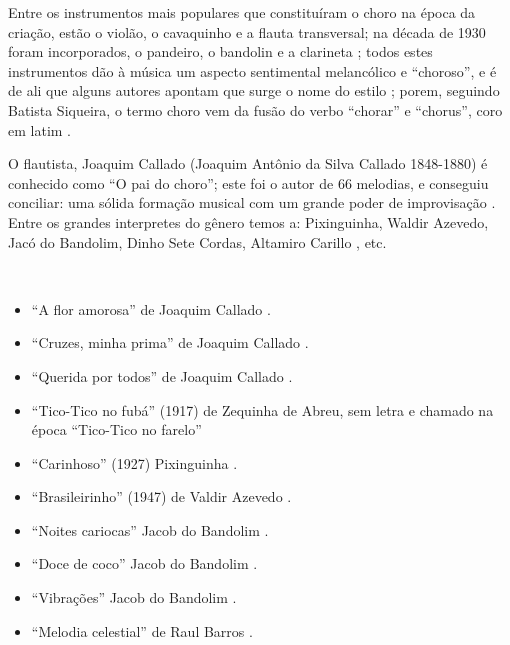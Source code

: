 \begin{description}
Entre os instrumentos mais populares que constituíram o choro na época da criação, 
estão o violão, o cavaquinho e a flauta transversal;
na década de 1930 foram incorporados, o pandeiro, o bandolin e a clarineta \cite[pp. 64]{reinato2010musica} \cite[pp. 79]{dourado2004dicionario} \cite[pp. 132]{perna2002samba};
todos estes instrumentos dão à música um aspecto sentimental melancólico e ``choroso'', e
é de ali que alguns autores apontam que surge o nome do estilo \cite[pp. 132]{perna2002samba};
porem, seguindo Batista Siqueira, 
o termo choro vem da fusão do verbo ``chorar'' e ``chorus'', coro em latim \cite[pp. 13]{diniz2003almanaque}.

O flautista, Joaquim Callado (Joaquim Antônio da Silva Callado 1848-1880) 
é conhecido como ``O pai do choro'';
este foi o autor de 66 melodias, e conseguiu conciliar: 
uma sólida formação musical com um grande poder de improvisação  \cite[pp. 15]{diniz2003almanaque} \cite[pp. 64]{reinato2010musica}.
Entre os grandes interpretes do gênero temos a:
Pixinguinha, Waldir Azevedo, Jacó do Bandolim, Dinho Sete Cordas, Altamiro Carillo \cite[pp. 79]{dourado2004dicionario}, etc.

\begin{example} ~

\begin{itemize}
\item ``A flor amorosa'' de Joaquim Callado \cite[pp. 8]{livingston2005choro} \cite[pp. 15]{diniz2003almanaque}.
\item ``Cruzes, minha prima'' de Joaquim Callado \cite[pp. 15]{diniz2003almanaque}.
\item ``Querida por todos'' de Joaquim Callado \cite[pp. 15]{diniz2003almanaque}.
\item ``Tico-Tico no fubá'' (1917) de Zequinha de Abreu, sem letra e chamado na época ``Tico-Tico no farelo'' \cite[pp. 6]{marcondes1998enciclopedia} \cite[pp. 39,91]{diniz2003almanaque}
\item ``Carinhoso'' (1927) Pixinguinha   \cite[pp. 133]{perna2002samba}.
\item ``Brasileirinho'' (1947) de Valdir Azevedo  \cite[pp. 133]{perna2002samba}.
\item ``Noites cariocas'' Jacob do Bandolim \cite{diniz2003almanaque}.
\item ``Doce de coco'' Jacob do Bandolim \cite{diniz2003almanaque}.
\item ``Vibrações'' Jacob do Bandolim \cite{diniz2003almanaque}.
\item ``Melodia celestial'' de Raul Barros \cite[pp. 130]{livingston2005choro}.
\end{itemize}
\end{example}


\end{description}
